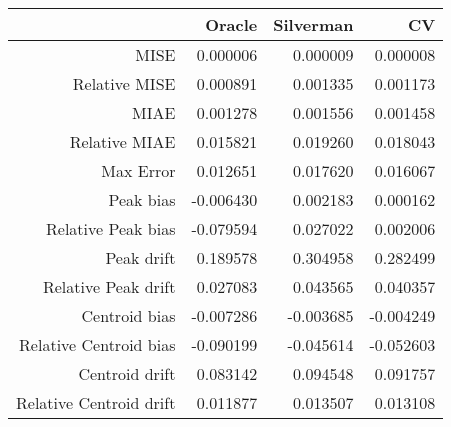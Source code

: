 \begin{tabular}{rrrr}
  \hline
 & Oracle & Silverman & CV \\ 
  \hline
MISE & 0.000006 & 0.000009 & 0.000008 \\ 
  Relative MISE & 0.000891 & 0.001335 & 0.001173 \\ 
  MIAE & 0.001278 & 0.001556 & 0.001458 \\ 
  Relative MIAE & 0.015821 & 0.019260 & 0.018043 \\ 
  Max Error & 0.012651 & 0.017620 & 0.016067 \\ 
  Peak bias & -0.006430 & 0.002183 & 0.000162 \\ 
  Relative Peak bias & -0.079594 & 0.027022 & 0.002006 \\ 
  Peak drift & 0.189578 & 0.304958 & 0.282499 \\ 
  Relative Peak drift & 0.027083 & 0.043565 & 0.040357 \\ 
  Centroid bias & -0.007286 & -0.003685 & -0.004249 \\ 
  Relative Centroid bias & -0.090199 & -0.045614 & -0.052603 \\ 
  Centroid drift & 0.083142 & 0.094548 & 0.091757 \\ 
  Relative Centroid drift & 0.011877 & 0.013507 & 0.013108 \\ 
   \hline
\end{tabular}
